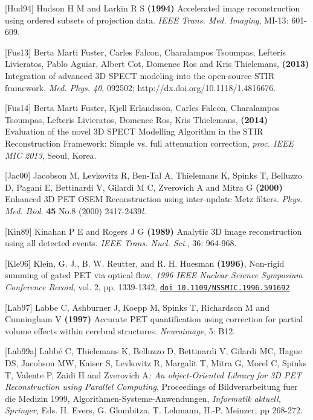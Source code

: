 \documentclass{article}
\def\url#1#2{\mbox{\href{#1}{\tt #2}}}
\begin{document}
{{{{{{{[}Hud94] Hudson H M and Larkin R S \textbf{(1994)} Accelerated image 
reconstruction using ordered subsets of projection data. \textit{IEEE 
Trans. Med. Imaging}, MI-13: 601-609.

{[}Fus13]  Berta Marti Fuster, Carles Falcon, Charalampos Tsoumpas, Lefteris Livieratos, Pablo Aguiar, Albert Cot, Domenec Ros and Kris Thielemans, \textbf{ (2013)} Integration of advanced 3D SPECT modeling into the open-source STIR framework, \textit{Med. Phys. 40}, 092502; http://dx.doi.org/10.1118/1.4816676.

{[}Fus14] Berta Marti Fuster, Kjell Erlandsson, Carles Falcon, Charalampos Tsoumpas, Lefteris Livieratos, Domenec Ros, Kris Thielemans, \textbf{(2014)}  Evaluation of the novel 3D SPECT Modelling Algorithm in the STIR Reconstruction Framework: Simple vs. full attenuation correction, \textit{proc. IEEE MIC 2013}, Seoul, Korea.

{[}Jac00] Jacobson M, Levkovitz R, Ben-Tal A, Thielemans K, Spinks 
T, Belluzzo D, Pagani E, Bettinardi V, Gilardi M C, Zverovich 
A and Mitra G \textbf{(2000)} Enhanced 3D PET OSEM Reconstruction 
using inter-update Metz filters. \textit{Phys. Med. Biol}. \textbf{45} No.8 
(2000) 2417-2439\textit{l.}


{[}Kin89] Kinahan P E and Rogers J G \textbf{(1989)} Analytic 3D image 
reconstruction using all detected events. \textit{IEEE Trans. Nucl. 
Sci.}, 36: 964-968.


[Kle96]
Klein, G. J., B. W. Reutter, and R. H. Huesman \textbf{(1996)}, Non-rigid summing of gated PET via optical flow, \textit{1996 IEEE Nuclear
Science Symposium Conference Record},
vol. 2, pp. 1339-1342, 
\url{http://dx.doi.org/10.1109/NSSMIC.1996.591692}{doi 10.1109/NSSMIC.1996.591692}

{[}Lab97] Labbe C, Ashburner J, Koepp M, Spinks T, Richardson M 
and Cunningham V \textbf{(1997)} Accurate PET quantification using 
correction for partial volume effects within cerebral structures. \textit{Neuroimage}, 
5: B12.


{[}Lab99a] Labb\'{e} C, Thielemans K, Belluzzo D, Bettinardi V, Gilardi 
MC, Hague DS, Jacobson MW, Kaiser S, Levkovitz R, Margalit T, 
Mitra G, Morel C, Spinks T, Valente P, Zaidi H and Zverovich A\textit{: 
An object-Oriented Library for 3D PET Reconstruction using Parallel 
Computing}, Proceedings of Bildverarbeitung fuer die Medizin 
1999, Algorithmen-Systeme-Anwendungen, \textit{Informatik} 
\textit{aktuell, Springer}, Eds. H. Evers, G. Glombitza, T. Lehmann, 
H.-P. Meinzer, pp 268-272. 

}}}}}}
\end{document}
